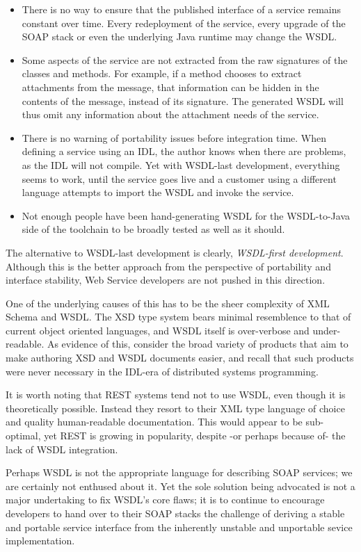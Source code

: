 \begin{itemize}

\item
    There is no way to ensure that the published interface of a service
    remains constant over time. Every redeployment of the service, every
    upgrade of the SOAP stack or even the underlying Java runtime may
    change the WSDL.

\item

Some aspects of the service are not extracted from the raw signatures
of the classes and methods. For example, if a method chooses to extract
attachments from the message, that information can be hidden in the contents
of the message, instead of its signature. The generated WSDL will thus
omit any information about the attachment needs of the service.

\item

There is no warning of portability issues before integration time. 
When defining a service using an IDL, the author knows
when there are problems, as the IDL will not compile. Yet with WSDL-last
development, everything seems to work, until the service goes live and
a customer using a different language attempts to import the WSDL and
invoke the service.

\item

Not enough people have been hand-generating WSDL for the WSDL-to-Java
side of the toolchain to be broadly tested as well as it should.

    
\end{itemize}

The alternative to WSDL-last development is clearly, \emph{WSDL-first
development}. Although this is the better approach from the perspective
of portability and interface stability, Web Service developers are not
pushed in this direction.

One of the underlying causes of this has to be the sheer complexity of
XML Schema and WSDL. The XSD type system bears minimal resemblence to
that of current object oriented languages, and WSDL itself is
over-verbose and under-readable. As evidence of this, 
consider the broad variety of products that aim to make authoring XSD
and WSDL documents easier, and recall that such products were never
necessary in the IDL-era of distributed systems programming.

It is worth noting that REST systems \cite{fielding:rest} tend not to
use WSDL, even though it is theoretically possible. Instead they resort
to their XML type language of choice and quality human-readable
documentation. This would appear to be sub-optimal, yet REST is growing
in popularity, despite -or perhaps because of- the lack of WSDL
integration. 

Perhaps WSDL is not the appropriate language for
describing SOAP services; we are certainly not enthused about it. Yet
the sole solution being advocated is not a major undertaking to fix
WSDL's core flaws; it is to continue to encourage developers to hand
over to their SOAP stacks the challenge of deriving a stable and portable 
service interface from the inherently unstable and unportable sevice
implementation.   
